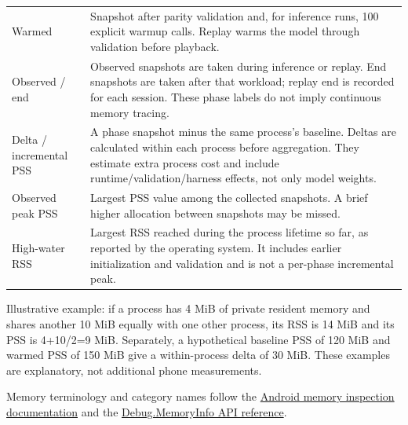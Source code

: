 \documentclass[10pt,a4paper]{article}
\begin{document}
\begin{longtable}{@{}>{\raggedright\arraybackslash}p{}>{\raggedright\arraybackslash}p{}@{}}
Warmed & Snapshot after parity validation and, for inference runs, 100 explicit warmup calls. Replay warms the model through validation before playback. \\
Observed /\allowbreak{} end & Observed snapshots are taken during inference or replay. End snapshots are taken after that workload; replay end is recorded for each session. These phase labels do not imply continuous memory tracing. \\
Delta /\allowbreak{} incremental PSS & A phase snapshot minus the same process's baseline. Deltas are calculated within each process before aggregation. They estimate extra process cost and include runtime/\allowbreak{}validation/\allowbreak{}harness effects, not only model weights. \\
Observed peak PSS & Largest PSS value among the collected snapshots. A brief higher allocation between snapshots may be missed. \\
High-water RSS & Largest RSS reached during the process lifetime so far, as reported by the operating system. It includes earlier initialization and validation and is not a per-phase incremental peak. \\
\end{longtable}\endgroup
Illustrative example:\allowbreak{} if a process has 4 MiB of private resident memory and shares another 10 MiB equally with one other process, its RSS is 14 MiB and its PSS is 4+10/\allowbreak{}2=9 MiB. Separately, a hypothetical baseline PSS of 120 MiB and warmed PSS of 150 MiB give a within-process delta of 30 MiB. These examples are explanatory, not additional phone measurements.

\noindent Memory terminology and category names follow the \href{https://developer.android.com/tools/dumpsys\#meminfo}{Android memory inspection documentation} and the \href{https://developer.android.com/reference/android/os/Debug.MemoryInfo}{Debug.MemoryInfo API reference}.\par
\end{document}
